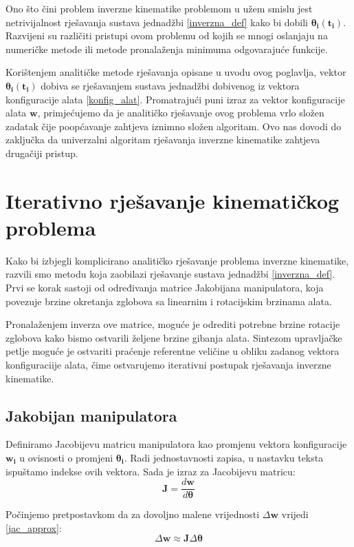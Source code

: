 \documentclass[times, utf8, diplomski, numeric]{fer}
\begin{document}
Ono što čini problem inverzne kinematike problemom u užem smislu jest netrivijalnost rješavanja sustava jednadžbi \ref{inverzna_def} kako bi dobili $\bm{\theta}_{\mathbf{i}}(\mathbf{t_i})$. 
Razvijeni su različiti pristupi ovom problemu od kojih se mnogi oslanjaju na numeričke metode ili metode pronalaženja minimuma odgovarajuće funkcije.

Korištenjem analitičke metode rješavanja opisane u uvodu ovog poglavlja, vektor $\bm{\theta}_{\mathbf{i}}(\mathbf{t_i})$ dobiva se rješavanjem sustava jednadžbi dobivenog iz vektora konfiguracije alata \ref{konfig_alat}. 
Promatrajući puni izraz za vektor konfiguracije alata $\mathbf{w}$, primjećujemo da je analitičko rješavanje ovog problema vrlo složen zadatak čije poopćavanje zahtjeva iznimno složen algoritam.
Ovo nas dovodi do zaključka da univerzalni algoritam rješavanja inverzne kinematike zahtjeva drugačiji pristup.

\section{Iterativno rješavanje kinematičkog problema}
Kako bi izbjegli komplicirano analitičko rješavanje problema inverzne kinematike, razvili smo metodu koja zaobilazi rješavanje sustava jednadžbi \ref{inverzna_def}.
Prvi se korak sastoji od određivanja matrice Jakobijana manipulatora, koja povezuje brzine okretanja zglobova sa linearnim i rotacijskim brzinama alata.

Pronalaženjem inverza ove matrice, moguće je odrediti potrebne brzine rotacije zglobova kako bismo ostvarili željene brzine gibanja alata.
Sintezom upravljačke petlje moguće je ostvariti praćenje referentne veličine u obliku zadanog vektora konfiguraciije alata, čime ostvarujemo iterativni postupak rješavanja inverzne kinematike.

\subsection{Jakobijan manipulatora}

Definiramo Jacobijevu matricu manipulatora kao promjenu vektora konfiguracije $\mathbf{w_i}$ u ovisnosti o promjeni $\bm{\theta}_{\mathbf{i}}$.
Radi jednostavnosti zapisa, u nastavku teksta ispuštamo indekse ovih vektora. Sada je izraz za Jacobijevu matricu:
\begin{equation}
\mathbf{J} =\frac{d\mathbf{w}}{d\bm{\theta}} 
\end{equation}

Počinjemo pretpostavkom da za dovoljno malene vrijednosti $\Delta \mathbf{w}$ vrijedi \ref{jac_approx}:
\begin{equation}
\Delta \mathbf{w} \approx \mathbf{J}  \Delta \bm{\theta}
\label{jac_approx}
\end{equation}
\end{document}

